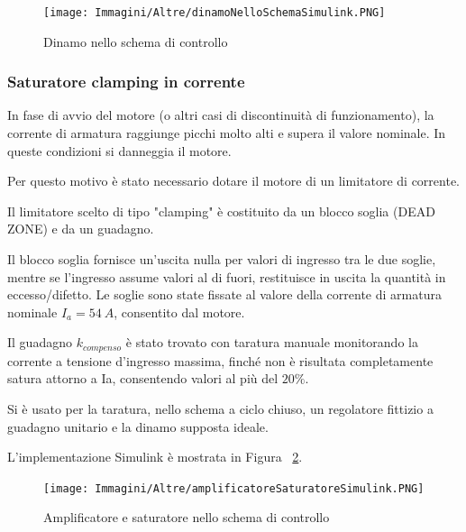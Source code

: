 \documentclass[a4paper,12pt]{article}
\begin{document}
\begin{figure}[h!]
\centering
    \texttt{[image: Immagini/Altre/dinamoNelloSchemaSimulink.PNG]}
    \caption{Dinamo nello schema di controllo}
    \label{fig:simulink_controllo_dinamo}
\end{figure}


\vspace{0.5cm}

\subsubsection{Saturatore clamping in corrente}

In fase di avvio del motore (o altri casi di discontinuità di funzionamento), la corrente di armatura raggiunge picchi molto alti e supera il valore nominale. In queste condizioni si danneggia il motore.

Per questo motivo è stato necessario dotare il motore di un limitatore di corrente.

\vspace{0.3cm}

Il limitatore scelto di tipo "clamping" è costituito da un blocco soglia (DEAD ZONE) e da un guadagno. 

Il blocco soglia fornisce un'uscita nulla per valori di ingresso tra le due soglie, mentre se l’ingresso assume valori al di fuori, restituisce in uscita la quantità in eccesso/difetto.
Le soglie sono state fissate al valore della corrente di armatura nominale $I_{a} = 54~A$, consentito dal motore.

Il guadagno $k_{compenso}$ è stato trovato con taratura manuale monitorando la corrente a tensione d'ingresso massima, finché non è risultata completamente satura attorno a Ia, consentendo valori al più del $20\%$. 

Si è usato per la taratura, nello schema a ciclo chiuso, un regolatore fittizio a guadagno unitario e la dinamo supposta ideale.

\vspace{0.5cm}

L'implementazione Simulink è mostrata in Figura ~\ref{fig:simulink_controllo_ampl_sat}.

\vspace{0.5cm}

\begin{figure}[h!]
\centering
    \texttt{[image: Immagini/Altre/amplificatoreSaturatoreSimulink.PNG]}
    \caption{Amplificatore e saturatore nello schema di controllo}
    \label{fig:simulink_controllo_ampl_sat}
\end{figure}
\end{document}
